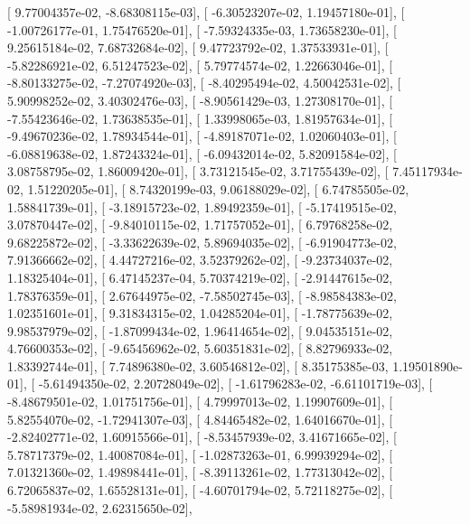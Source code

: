 \documentclass{article}
\begin{document}
       [  9.77004357e-02,  -8.68308115e-03],
       [ -6.30523207e-02,   1.19457180e-01],
       [ -1.00726177e-01,   1.75476520e-01],
       [ -7.59324335e-03,   1.73658230e-01],
       [  9.25615184e-02,   7.68732684e-02],
       [  9.47723792e-02,   1.37533931e-01],
       [ -5.82286921e-02,   6.51247523e-02],
       [  5.79774574e-02,   1.22663046e-01],
       [ -8.80133275e-02,  -7.27074920e-03],
       [ -8.40295494e-02,   4.50042531e-02],
       [  5.90998252e-02,   3.40302476e-03],
       [ -8.90561429e-03,   1.27308170e-01],
       [ -7.55423646e-02,   1.73638535e-01],
       [  1.33998065e-03,   1.81957634e-01],
       [ -9.49670236e-02,   1.78934544e-01],
       [ -4.89187071e-02,   1.02060403e-01],
       [ -6.08819638e-02,   1.87243324e-01],
       [ -6.09432014e-02,   5.82091584e-02],
       [  3.08758795e-02,   1.86009420e-01],
       [  3.73121545e-02,   3.71755439e-02],
       [  7.45117934e-02,   1.51220205e-01],
       [  8.74320199e-03,   9.06188029e-02],
       [  6.74785505e-02,   1.58841739e-01],
       [ -3.18915723e-02,   1.89492359e-01],
       [ -5.17419515e-02,   3.07870447e-02],
       [ -9.84010115e-02,   1.71757052e-01],
       [  6.79768258e-02,   9.68225872e-02],
       [ -3.33622639e-02,   5.89694035e-02],
       [ -6.91904773e-02,   7.91366662e-02],
       [  4.44727216e-02,   3.52379262e-02],
       [ -9.23734037e-02,   1.18325404e-01],
       [  6.47145237e-04,   5.70374219e-02],
       [ -2.91447615e-02,   1.78376359e-01],
       [  2.67644975e-02,  -7.58502745e-03],
       [ -8.98584383e-02,   1.02351601e-01],
       [  9.31834315e-02,   1.04285204e-01],
       [ -1.78775639e-02,   9.98537979e-02],
       [ -1.87099434e-02,   1.96414654e-02],
       [  9.04535151e-02,   4.76600353e-02],
       [ -9.65456962e-02,   5.60351831e-02],
       [  8.82796933e-02,   1.83392744e-01],
       [  7.74896380e-02,   3.60546812e-02],
       [  8.35175385e-03,   1.19501890e-01],
       [ -5.61494350e-02,   2.20728049e-02],
       [ -1.61796283e-02,  -6.61101719e-03],
       [ -8.48679501e-02,   1.01751756e-01],
       [  4.79997013e-02,   1.19907609e-01],
       [  5.82554070e-02,  -1.72941307e-03],
       [  4.84465482e-02,   1.64016670e-01],
       [ -2.82402771e-02,   1.60915566e-01],
       [ -8.53457939e-02,   3.41671665e-02],
       [  5.78717379e-02,   1.40087084e-01],
       [ -1.02873263e-01,   6.99939294e-02],
       [  7.01321360e-02,   1.49898441e-01],
       [ -8.39113261e-02,   1.77313042e-02],
       [  6.72065837e-02,   1.65528131e-01],
       [ -4.60701794e-02,   5.72118275e-02],
       [ -5.58981934e-02,   2.62315650e-02],
\end{document}
